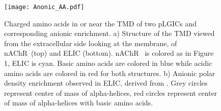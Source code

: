 \documentclass[9pt]{article}
\newcommand{\nachr}{nAChR}
\newcommand{\plgic}{pLGIC}
\begin{document}
\renewcommand{\thefigure}{SI 2}

\begin{figure}
	\center
	\texttt{[image: Anonic\_AA.pdf]}
	\caption{Charged amino acids in or near the TMD of two \plgic s and corresponding anionic enrichment. a) Structure of the TMD viewed from the extracellular side looking at the membrane, of \nachr~(top)\cite{Unwin2005} and ELIC\cite{Pan2012} (bottom). \nachr~ is colored as in Figure 1, ELIC is cyan. Basic amino acids are colored in blue while acidic amino acids are colored in red for both structures. b) Anionic polar density enrichment observed in ELIC, derived from \cite{Tong2019}. Grey circles represent center of mass of alpha-helices, red circles represent center of mass of alpha-helices with basic amino acids. }
	\label{fig:aaa}
\end{figure}
\renewcommand{\thetable}{SI 2}
\end{document}
